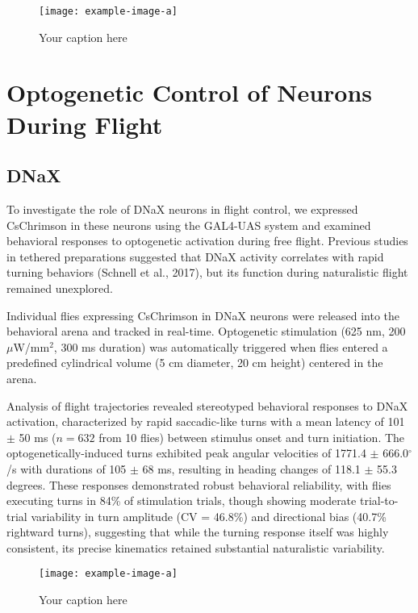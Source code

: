 \documentclass[../main/thesis_msc.tex]{subfiles}
\begin{document}
\begin{figure}[htbp]
    \centering
    \texttt{[image: example-image-a]}
    \caption{Your caption here}
    \label{fig:your-label}
\end{figure}

\section{Optogenetic Control of Neurons During Flight}
\subsection{DNaX}

To investigate the role of DNaX neurons in flight control, we expressed CsChrimson in these neurons using the GAL4-UAS system and examined behavioral responses to optogenetic activation during free flight. Previous studies in tethered preparations suggested that DNaX activity correlates with rapid turning behaviors (Schnell et al., 2017), but its function during naturalistic flight remained unexplored.

Individual flies expressing CsChrimson in DNaX neurons were released into the behavioral arena and tracked in real-time. Optogenetic stimulation (625 nm, 200 $\mu$W/mm$^2$, 300 ms duration) was automatically triggered when flies entered a predefined cylindrical volume (5 cm diameter, 20 cm height) centered in the arena.

Analysis of flight trajectories revealed stereotyped behavioral responses to DNaX activation, characterized by rapid saccadic-like turns with a mean latency of 101 $\pm$ 50 ms ($n = 632$ from 10 flies) between stimulus onset and turn initiation. The optogenetically-induced turns exhibited peak angular velocities of 1771.4 $\pm$ 666.0$^{\circ}$/s with durations of 105 $\pm$ 68 ms, resulting in heading changes of 118.1 $\pm$ 55.3 degrees. These responses demonstrated robust behavioral reliability, with flies executing turns in 84\% of stimulation trials, though showing moderate trial-to-trial variability in turn amplitude (CV = 46.8\%) and directional bias (40.7\% rightward turns), suggesting that while the turning response itself was highly consistent, its precise kinematics retained substantial naturalistic variability.

\begin{figure}[htbp]
    \centering
    \texttt{[image: example-image-a]}
    \caption{Your caption here}
    \label{fig:your-label}
\end{figure}
\end{document}

